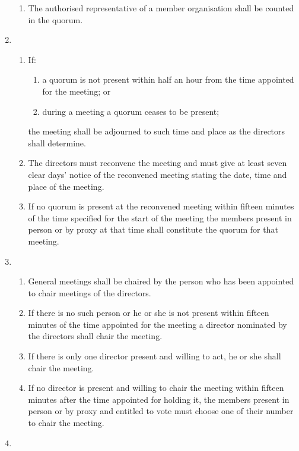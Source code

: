 \documentclass{article}
\begin{document}
\begin{enumerate}[label=\arabic*]
\begin{enumerate}[label=(\arabic*)]
        \item The authorised representative of a member organisation shall
        be counted in the quorum.
    \end{enumerate}
    \item \begin{enumerate}[label=(\arabic*)]
        \item If:
        \begin{enumerate}[label=(\alph*)]
            \item a quorum is not present within half an hour from the time
            appointed for the meeting; or
            \item during a meeting a quorum ceases to be present;
        \end{enumerate}
        the meeting shall be adjourned to such time and place as the
        directors shall determine.
        \item The directors must reconvene the meeting and must give at
        least seven clear days' notice of the reconvened meeting stating
        the date, time and place of the meeting.
        \item If no quorum is present at the reconvened meeting within
        fifteen minutes of the time specified for the start of the meeting
        the members present in person or by proxy at that time shall
        constitute the quorum for that meeting.
    \end{enumerate}
    \item \begin{enumerate}[label=(\arabic*)]
        \item General meetings shall be chaired by the person who has been
        appointed to chair meetings of the directors.
        \item If there is no such person or he or she is not present within
        fifteen minutes of the time appointed for the meeting a director
        nominated by the directors shall chair the meeting.
        \item If there is only one director present and willing to act, he or she
        shall chair the meeting.
        \item If no director is present and willing to chair the meeting within
        fifteen minutes after the time appointed for holding it, the
        members present in person or by proxy and entitled to vote
        must choose one of their number to chair the meeting.
    \end{enumerate}
    \item \begin{enumerate}[label=(\arabic*)]

\end{enumerate}
\end{enumerate}
\end{document}
